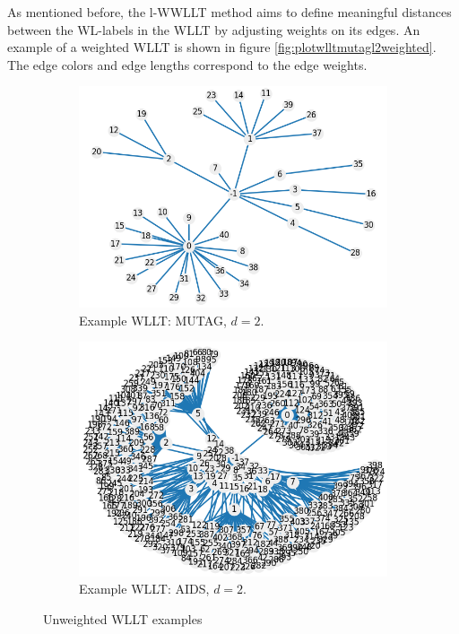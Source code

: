 		As mentioned before, the l-WWLLT method aims to define meaningful distances between the WL-labels in the WLLT by adjusting weights on its edges.		
		An example of a weighted WLLT is shown in figure \ref{fig:plotwlltmutagl2weighted}.
		The edge colors and edge lengths correspond to the edge weights.
		
		\begin{figure}[H]
			\centering
			\begin{subfigure}{0.49\textwidth}
				\centering
				\includegraphics[width=1.0\linewidth]{images/plot_wllt_MUTAGl2}
				\caption{Example WLLT: MUTAG, $d=2$.}
				\label{fig:plotwlltmutagl2}
			\end{subfigure}
			\begin{subfigure}{0.49\textwidth}
				\centering
				\includegraphics[width=1.0\linewidth]{images/plot_wllt_l2_e0_AIDS_29_15h-25m}
				\caption{Example WLLT: AIDS, $d=2$.}
				\label{fig:plotwlltl2e0aids2915h-25m}
			\end{subfigure}
			\caption{Unweighted WLLT examples}\label{fig:combined}
		\end{figure}
		
